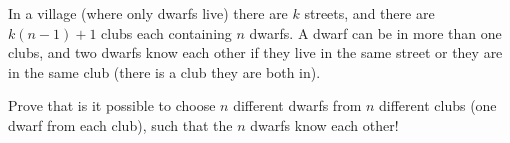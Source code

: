 In a village (where only dwarfs live) there are $k$ streets, and there are $k(n-1)+1$ clubs each containing $n$ dwarfs. A dwarf can be in more than one clubs, and two dwarfs know each other if they live in the same street or they are in  the same club (there is a club they are both in).

Prove that is it possible to choose $n$ different dwarfs from $n$ different clubs (one dwarf from each club), such that the $n$ dwarfs know each other!